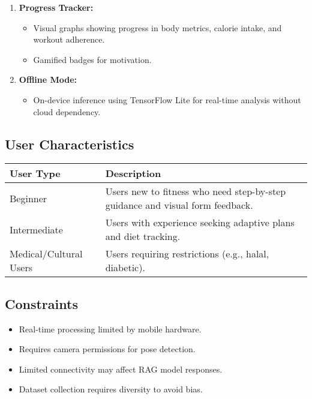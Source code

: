 \documentclass[12pt,a4paper]{article}
\begin{document}
\begin{enumerate}[leftmargin=*]
    \item \textbf{Progress Tracker:}
    \begin{itemize}
        \item Visual graphs showing progress in body metrics, calorie intake, and workout adherence.
        \item Gamified badges for motivation.
    \end{itemize}
    
    \item \textbf{Offline Mode:}
    \begin{itemize}
        \item On-device inference using TensorFlow Lite for real-time analysis without cloud dependency.
    \end{itemize}
\end{enumerate}

\subsection{User Characteristics}
\begin{table}[h!]
\centering
\begin{tabular}{>{\raggedright\arraybackslash}p{4cm}>{\raggedright\arraybackslash}p{9cm}}
\toprule
\textbf{User Type} & \textbf{Description} \\
\midrule
Beginner & Users new to fitness who need step-by-step guidance and visual form feedback. \\
Intermediate & Users with experience seeking adaptive plans and diet tracking. \\
Medical/Cultural Users & Users requiring restrictions (e.g., halal, diabetic). \\
\bottomrule
\end{tabular}
\end{table}

\subsection{Constraints}
\begin{itemize}[leftmargin=*]
    \item Real-time processing limited by mobile hardware.
    \item Requires camera permissions for pose detection.
    \item Limited connectivity may affect RAG model responses.
    \item Dataset collection requires diversity to avoid bias.
\end{itemize}
\end{document}
